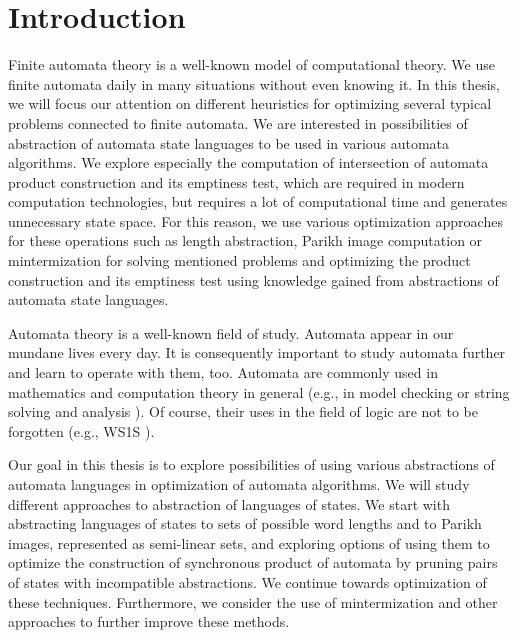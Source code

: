 \chapter{Introduction}


Finite automata theory is a well-known model of computational theory. We use finite automata daily in many situations without even knowing it. In this thesis, we will focus our attention on different heuristics for optimizing several typical problems connected to finite automata. We are interested in possibilities of abstraction of automata state languages to be used in various automata algorithms. We explore especially the computation of intersection of automata product construction and its emptiness test, which are required in modern computation technologies, but requires a lot of computational time and generates unnecessary state space. For this reason, we use various optimization approaches for these operations such as length abstraction, Parikh image computation or mintermization for solving mentioned problems and optimizing the product construction and its emptiness test using knowledge gained from abstractions of automata state languages.

Automata theory is a well-known field of study. Automata appear in our mundane lives every day. It is consequently important to study automata further and learn to operate with them, too. Automata are commonly used in mathematics and computation theory in general (e.g., in model checking \cite{DBLP:conf/cav/SiegelY20} or string solving and analysis \cite{DBLP:conf/popl/LinB16}). Of course, their uses in the field of logic are not to be forgotten (e.g., WS1S \cite{DBLP:conf/tacas/FiedorHJLV17, DBLP:journals/acta/FiedorHLV19}).

Our goal in this thesis is to explore possibilities of using various abstractions of automata languages in optimization of automata algorithms. We will study different approaches to abstraction of languages of states. We start with abstracting languages of states to sets of possible word lengths and to Parikh images, represented as semi-linear sets, and exploring options of using them to optimize the construction of synchronous product of automata by pruning pairs of states with incompatible abstractions. We continue towards optimization of these techniques. Furthermore, we consider the use of mintermization and other approaches to further improve these methods.


